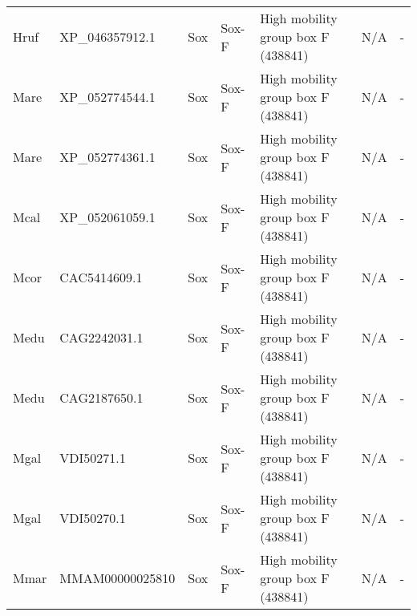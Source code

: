 \documentclass[../main.tex]{subfiles}
\begin{document}
\begin{landscape}
\begin{longtable}{lllllll}
		Hruf           & XP\_046357912.1       & Sox            & Sox-F               & High mobility group box F (438841)          & N/A                                                                    & -                    \\
		Mare           & XP\_052774544.1       & Sox            & Sox-F               & High mobility group box F (438841)          & N/A                                                                    & -                    \\
		Mare           & XP\_052774361.1       & Sox            & Sox-F               & High mobility group box F (438841)          & N/A                                                                    & -                    \\
		Mcal           & XP\_052061059.1       & Sox            & Sox-F               & High mobility group box F (438841)          & N/A                                                                    & -                    \\
		Mcor           & CAC5414609.1          & Sox            & Sox-F               & High mobility group box F (438841)          & N/A                                                                    & -                    \\
		Medu           & CAG2242031.1          & Sox            & Sox-F               & High mobility group box F (438841)          & N/A                                                                    & -                    \\
		Medu           & CAG2187650.1          & Sox            & Sox-F               & High mobility group box F (438841)          & N/A                                                                    & -                    \\
		Mgal           & VDI50271.1            & Sox            & Sox-F               & High mobility group box F (438841)          & N/A                                                                    & -                    \\
		Mgal           & VDI50270.1            & Sox            & Sox-F               & High mobility group box F (438841)          & N/A                                                                    & -                    \\
		Mmar           & MMAM00000025810       & Sox            & Sox-F               & High mobility group box F (438841)          & N/A                                                                    & -                    \\

\end{longtable}
\end{landscape}
\end{document}
